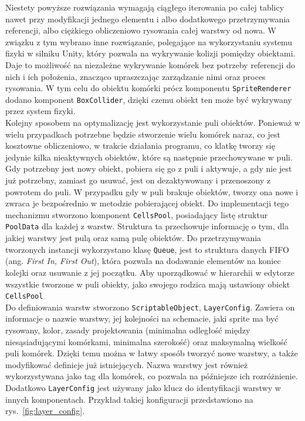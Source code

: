 Niestety powyższe rozwiązania wymagają ciągłego iterowania po całej tablicy nawet przy modyfikacji jednego elementu
i albo dodatkowego przetrzymywania referencji, albo ciężkiego obliczeniowo rysowania całej warstwy od nowa.
W związku z tym wybrano inne rozwiązanie, polegające na wykorzystaniu systemu fizyki w silniku Unity,
który pozwala na wykrywanie kolizji pomiędzy obiektami.
Daje to możliwość na niezależne wykrywanie komórek bez potrzeby referencji do nich i ich położenia,
znacząco upraszczając zarządzanie nimi oraz proces rysowania.
W tym celu do obiektu komórki prócz komponentu \texttt{SpriteRenderer} dodano komponent \texttt{BoxCollider},
dzięki czemu obiekt ten może być wykrywany przez system fizyki.\\
\indent Kolejny sposobem na optymalizację jest wykorzystanie puli obiektów.
Ponieważ w wielu przypadkach potrzebne będzie stworzenie wielu komórek naraz, co jest kosztowne obliczeniowo,
w trakcie działania programu, co klatkę tworzy się jedynie kilka nieaktywnych obiektów, które są następnie przechowywane w puli.
Gdy potrzebny jest nowy obiekt, pobiera się go z puli i aktywuje, a gdy nie jest już potrzebny,
zamiast go usuwać, jest on dezaktywowany i przenoszony z powrotem do puli.
W przypadku gdy w puli brakuje obiektów, tworzy ona nowe i zwraca je bezpośrednio w metodzie pobierającej obiekt.
Do implementacji tego mechanizmu stworzono komponent \texttt{CellsPool},
posiadający listę struktur \texttt{PoolData} dla każdej z warstw.
Struktura ta przechowuje informację o tym, dla jakiej warstwy jest pulą oraz samą pulę obiektów.
Do przetrzymywania tworzonych instancji wykorzystano klasę \texttt{Queue},
jest to struktura danych FIFO (ang. \textit{First In, First Out}),
która pozwala na dodawanie elementów na koniec kolejki oraz usuwanie z jej początku.
Aby uporządkować w hierarchii w edytorze wszystkie tworzone w puli obiekty,
jako swojego rodzica mają ustawiony obiekt \texttt{CellsPool}\\
\indent Do definiowania warstw stworzono \texttt{ScriptableObject}, \texttt{LayerConfig}.
Zawiera on informacje o nazwie warstwy, jej kolejności na schemacie, jaki sprite ma być rysowany, kolor,
zasady projektowania (minimalna odległość między niesąsiadującymi komórkami, minimalna szerokość)
oraz maksymalną wielkość puli komórek.
Dzięki temu można w łatwy sposób tworzyć nowe warstwy, a także modyfikować definicje już istniejących.
Nazwa warstwy jest również wykorzystywana jako tag dla komórek, co pozwala na późniejsze ich rozróżnienie.
Dodatkowo \texttt{LayerConfig} jest używany jako klucz do identyfikacji warstwy w innych komponentach.
Przykład takiej konfiguracji przedstawiono na rys.~\ref{fig:layer_config}.


